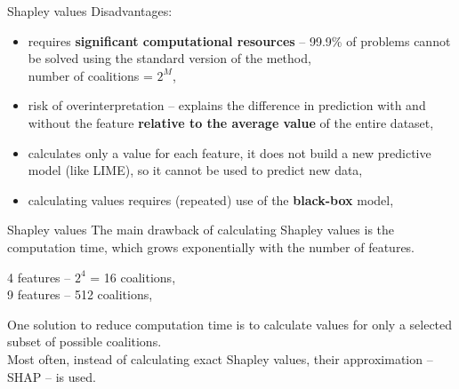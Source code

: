 \documentclass{beamer}
\begin{document}
\begin{frame}{Shapley values}
Disadvantages:
\begin{itemize}
\item requires \textbf{significant computational resources} – 99.9\% of problems cannot be solved using the standard version of the method, \\
number of coalitions = $2^M$,
\item risk of overinterpretation – explains the difference in prediction with and without the feature \textbf{relative to the average value} of the entire dataset,
\item calculates only a value for each feature, it does not build a new predictive model (like LIME), so it cannot be used to predict new data,
\item calculating values requires (repeated) use of the \textbf{black-box} model,
\end{itemize}
\end{frame}

\begin{frame}{Shapley values}
The main drawback of calculating Shapley values is the computation time, which grows exponentially with the number of features. \\
\begin{center}
4 features – $2^4$ = 16 coalitions,\\
9 features – 512 coalitions,\\
\end{center}
\bigskip
One solution to reduce computation time is to calculate values for only a selected subset of possible coalitions.\\
\bigskip
Most often, instead of calculating exact Shapley values, their approximation – SHAP – is used.
\end{frame}
\end{document}
